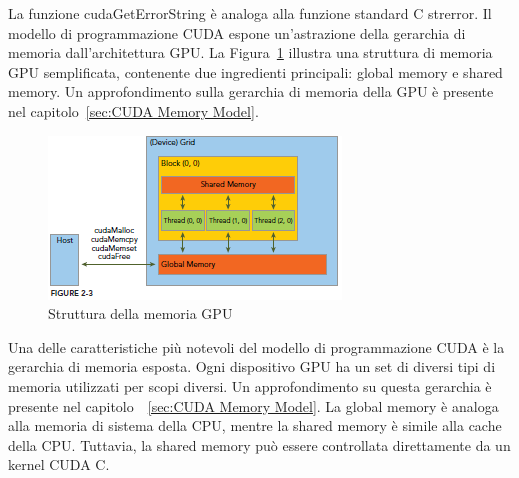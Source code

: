 La funzione cudaGetErrorString è analoga alla funzione standard C strerror.
Il modello di programmazione CUDA espone un'astrazione della gerarchia di memoria dall'architettura GPU. La Figura~\ref{fig:GPU_Memory_Structure} illustra una struttura di memoria GPU semplificata, contenente due ingredienti principali: global memory e shared memory. Un approfondimento sulla gerarchia di memoria della GPU è presente nel capitolo~\ref{sec:CUDA Memory Model}.
\begin{figure}[h!]
	\centering
	\includegraphics[width=.85\textwidth]{Immagini/CUDA/GPU_Memory_Structure}
	\caption{Struttura della memoria GPU \cite{Cheng:ProfessionalCudaProgramming}}
	\label{fig:GPU_Memory_Structure}
\end{figure}
Una delle caratteristiche più notevoli del modello di programmazione CUDA è la gerarchia di memoria esposta. Ogni dispositivo GPU ha un set di diversi tipi di memoria utilizzati per scopi diversi. Un approfondimento su questa gerarchia è presente nel capitolo~~\ref{sec:CUDA Memory Model}. La global memory è analoga alla memoria di sistema della CPU, mentre la shared memory è simile alla cache della CPU. Tuttavia, la shared memory può essere controllata direttamente da un kernel CUDA C.

